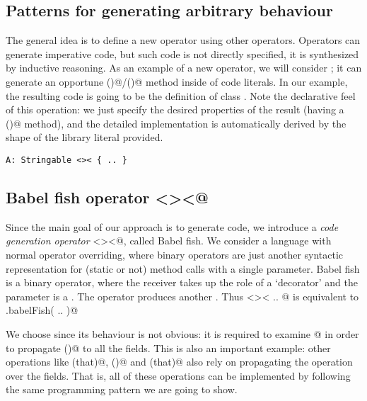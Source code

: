 







\subsection*{Patterns for generating arbitrary behaviour}
The general idea is to define a new operator
using other operators.
Operators can generate imperative code, but such code is not directly
specified, it is synthesized by inductive reasoning.
As an example of a new operator, we will
consider \Q@Stringable@;
it can generate an opportune \Q@toS()@/\Q@toString()@ method inside of code literals.
In our example, the resulting code is going to be the definition
of class \Q@A@.
Note the declarative feel of this operation: we just specify the desired properties of the result (having a \Q@toS()@ method), and the detailed implementation is  
 automatically derived by the shape of the library literal provided.

\begin{lstlisting}
A: Stringable <>< { .. }
\end{lstlisting}

\subsection*{Babel fish operator \Q@<><@}
Since the main goal of our approach is to generate code, we introduce a \emph{code generation operator} \Q@<><@, called Babel fish.
We consider a language with normal operator overriding, where binary operators are just another syntactic representation for (static or not) method calls with a single parameter.
Babel fish is a binary operator, where the receiver takes up the role
of a `decorator' and the parameter is a \Q@Library@. The operator produces another \Q@Library@.
Thus \Q@Stringable <>< { .. }@ is equivalent to \Q@Stringable.babelFish({ .. })@ 




We choose \Q@Stringable@ since its behaviour is not obvious: it is required to examine @ in order to 
propagate \Q@toS()@ to all the fields.
This is also an important example: other operations like \Q@equals(that)@, \Q@hashCode()@ and \Q@compare(that)@
also rely on propagating the operation over the fields.
That is, all of these operations can be implemented by
following the same programming pattern we are going to show.

